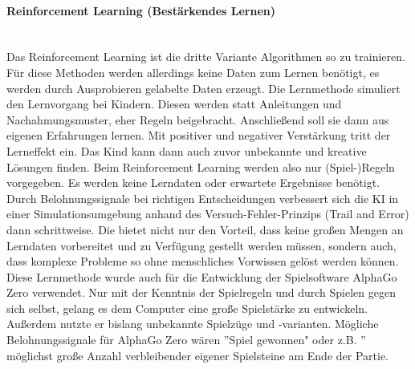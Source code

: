 \documentclass[a4paper,12pt, german]{report}
\begin{document}
\paragraph{Reinforcement Learning (Bestärkendes Lernen)} $ $ \\ Das Reinforcement Learning ist die dritte Variante Algorithmen so zu trainieren. Für diese Methoden werden allerdings keine Daten zum Lernen benötigt, es werden durch Ausprobieren gelabelte Daten erzeugt. \cite{17} \newline
Die Lernmethode simuliert den Lernvorgang bei Kindern. Diesen werden statt Anleitungen und Nachahmungsmuster, eher Regeln beigebracht. Anschließend soll sie dann aus eigenen Erfahrungen lernen. Mit positiver und negativer Verstärkung tritt der Lerneffekt ein. Das Kind kann dann auch zuvor unbekannte und kreative Lösungen finden.
Beim Reinforcement Learning werden also nur (Spiel-)Regeln vorgegeben. Es werden keine Lerndaten oder erwartete Ergebnisse benötigt. Durch Belohnungssignale bei richtigen Entscheidungen verbessert sich die KI in einer Simulationsumgebung anhand des Versuch-Fehler-Prinzips (Trail and Error) dann schrittweise. Die bietet nicht nur den Vorteil, dass keine großen Mengen an Lerndaten vorbereitet und zu Verfügung gestellt werden müssen, sondern auch, dass komplexe Probleme so ohne menschliches Vorwissen gelöst werden können.%
\newline
Diese Lernmethode wurde auch für die Entwicklung der Spielsoftware AlphaGo Zero verwendet. Nur mit der Kenntnis der Spielregeln und durch Spielen gegen sich selbst, gelang es dem Computer eine große Spielstärke zu entwickeln. Außerdem nutzte er bislang unbekannte Spielzüge und -varianten. Mögliche Belohnungssignale für AlphaGo Zero wären ''Spiel gewonnen" oder z.B. '' möglichst große Anzahl verbleibender eigener Spielsteine am Ende der Partie.
\cite{02}


\end{document}
